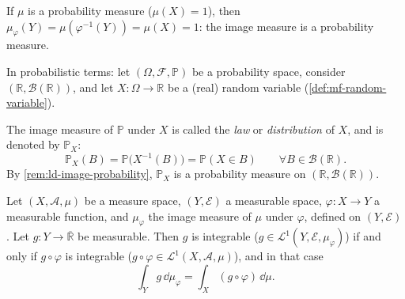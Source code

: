 \begin{remark}\label{rem:ld-image-probability}
If $\mu$ is a probability measure ($\mu(X)=1$), then
$\mu_\varphi(Y)=\mu(\varphi^{-1}(Y))=\mu(X)=1$: the image measure is a probability measure.
\end{remark}

In probabilistic terms: let $(\Omega,\mathcal F,\mathbb P)$ be a probability space, consider
$(\mathbb R,\mathcal B(\mathbb R))$, and let $X:\Omega\to\mathbb R$ be a (real) random variable
(\cref{def:mf-random-variable}).

\begin{definition}\label{def:ld-law}
The image measure of $\mathbb P$ under $X$ is called the \emph{law} or \emph{distribution} of
$X$, and is denoted by $\mathbb P_X$:
\[
  \mathbb P_X(B)=\mathbb P\big(X^{-1}(B)\big)=\mathbb P(X\in B)\qquad\forall B\in\mathcal B(\mathbb R).
\]
By \cref{rem:ld-image-probability}, $\mathbb P_X$ is a probability measure on
$(\mathbb R,\mathcal B(\mathbb R))$.
\end{definition}

\begin{theorem}\label{thm:ld-image-integral}
Let $(X,\mathcal A,\mu)$ be a measure space, $(Y,\mathcal E)$ a measurable space,
$\varphi:X\to Y$ a measurable function, and $\mu_\varphi$ the image measure of $\mu$ under
$\varphi$, defined on $(Y,\mathcal E)$. Let $g:Y\to\overline{\mathbb R}$ be measurable. Then $g$
is integrable ($g\in\mathcal L^1(Y,\mathcal E,\mu_\varphi)$) if and only if $g\circ\varphi$ is
integrable ($g\circ\varphi\in\mathcal L^1(X,\mathcal A,\mu)$), and in that case
\[
  \int_Yg\,\dd\mu_\varphi=\int_X(g\circ\varphi)\,\dd\mu .
\]
\end{theorem}

